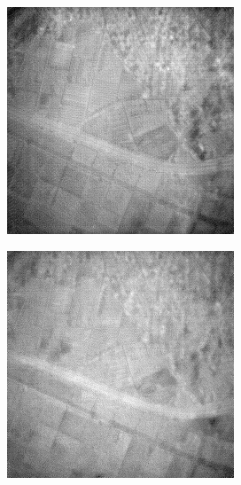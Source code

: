 \documentclass[10pt,twocolumn,letterpaper]{article}
\begin{document}
\begin{figure}[!ht]
\begin{subfigure}[b]{0.19\textwidth}
  \end{subfigure}
  \hfill
  \begin{subfigure}[b]{0.19\textwidth}
      \centering
      \includegraphics[width=\textwidth]{../figs/outputs/cut/112.png}
  \end{subfigure}
  \hfill
  \begin{subfigure}[b]{0.19\textwidth}
      \centering
      \includegraphics[width=\textwidth]{../figs/outputs/petit/112.png}

\end{subfigure}
\end{figure}
\end{document}
